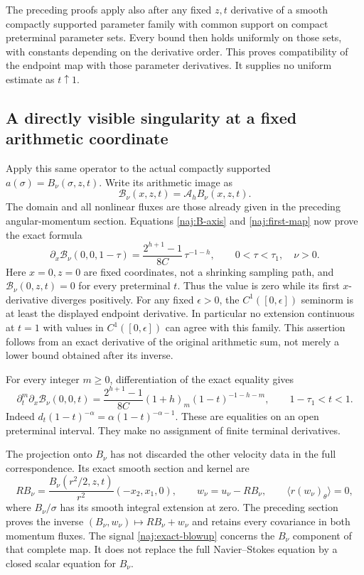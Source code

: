 The preceding proofs apply also after any fixed \(z,t\) derivative of
a smooth compactly supported parameter family with common support on
compact preterminal parameter sets. Every bound then holds uniformly
on those sets, with constants depending on the derivative order.
This proves compatibility of the endpoint map with those parameter
derivatives. It supplies no uniform estimate as \(t\uparrow1\).

\subsection*{A directly visible singularity at a fixed arithmetic coordinate}

Apply this same operator to the actual compactly supported
\(a(\sigma)=B_\nu(\sigma,z,t)\). Write its arithmetic image as
\[
 \mathcal B_\nu(x,z,t)=\mathcal A_hB_\nu(x,z,t).
\]
The domain and all nonlinear fluxes are those already given in the
preceding angular-momentum section. Equations \eqref{naj:B-axis} and
\eqref{naj:first-map} now prove the exact formula
\begin{equation}\label{naj:exact-blowup}
 \boxed{\displaystyle
 \partial_x\mathcal B_\nu(0,0,1-\tau)
    =\frac{2^{h+1}-1}{8C}\,\tau^{-1-h},
       \qquad 0<\tau<\tau_1,\quad \nu>0 .}
\end{equation}
Here \(x=0,z=0\) are fixed coordinates, not a shrinking sampling path,
and \(\mathcal B_\nu(0,z,t)=0\) for every preterminal \(t\).
Thus the value is zero while its first \(x\)-derivative diverges
positively. For any fixed \(\epsilon>0\), the \(C^1([0,\epsilon])\)
seminorm is at least the displayed endpoint derivative. In particular
no extension continuous at \(t=1\) with values in
\(C^1([0,\epsilon])\) can agree with this family.
This assertion follows from an exact derivative of the original
arithmetic sum, not merely a lower bound obtained after its inverse.

For every integer \(m\ge0\), differentiation of the exact equality gives
\[
 \partial_t^m\partial_x\mathcal B_\nu(0,0,t)
  =\frac{2^{h+1}-1}{8C}(1+h)_m(1-t)^{-1-h-m},
 \qquad 1-\tau_1<t<1 .
\]
Indeed \(d_t(1-t)^{-\alpha}=\alpha(1-t)^{-\alpha-1}\).
These are equalities on an open preterminal interval. They make no
assignment of finite terminal derivatives.

The projection onto \(B_\nu\) has not discarded the other velocity
data in the full correspondence. Its exact smooth section and kernel
are
\[
 R B_\nu=\frac{B_\nu(r^2/2,z,t)}{r^2}(-x_2,x_1,0),\qquad
 w_\nu=u_\nu-RB_\nu,\qquad \langle r(w_\nu)_\theta\rangle=0,
\]
where \(B_\nu/\sigma\) has its smooth integral extension at zero.
The preceding section proves the inverse
\((B_\nu,w_\nu)\mapsto RB_\nu+w_\nu\) and retains every covariance
in both momentum fluxes. The signal \eqref{naj:exact-blowup} concerns
the \(B_\nu\) component of that complete map. It does not replace the
full Navier--Stokes equation by a closed scalar equation for \(B_\nu\).

